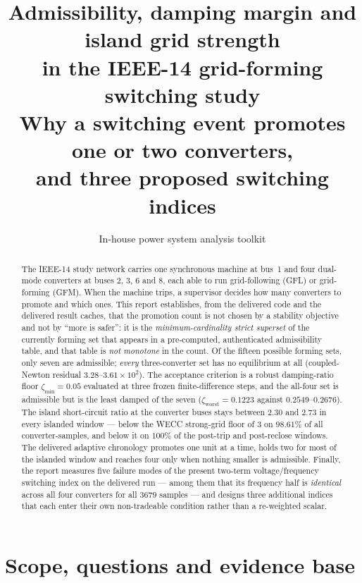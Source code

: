 \documentclass[12pt,a4paper]{article}
\title{\bfseries Admissibility, damping margin and island grid strength\\[2pt]
in the IEEE-14 grid-forming switching study\\[8pt]
\large Why a switching event promotes one or two converters,\\
and three proposed switching indices}
\author{In-house power system analysis toolkit}
\date{}
\theoremstyle{remark}
\newcommand{\zmin}{\zeta_{\min}}
\newcommand{\zworst}{\zeta_{\mathrm{worst}}}
\begin{document}
\maketitle
\thispagestyle{fancy}

\begin{abstract}
\noindent
The IEEE-14 study network carries one synchronous machine at bus~1 and four
dual-mode converters at buses 2, 3, 6 and 8, each able to run grid-following
(GFL) or grid-forming (GFM). When the machine trips, a supervisor decides how
many converters to promote and which ones. This report establishes, from the
delivered code and the delivered result caches, that the promotion count is not
chosen by a stability objective and not by ``more is safer'': it is the
\emph{minimum-cardinality strict superset} of the currently forming set that
appears in a pre-computed, authenticated admissibility table, and that table is
\emph{not monotone} in the count. Of the fifteen possible forming sets, only seven
are admissible; \emph{every} three-converter set has no equilibrium at all
(coupled-Newton residual $3.28$--$3.61\times10^{2}$). The acceptance criterion is
a robust damping-ratio floor $\zmin = 0.05$ evaluated at three frozen
finite-difference steps, and the all-four set is admissible but is the least
damped of the seven ($\zworst = 0.1223$ against $0.2549$--$0.2676$). The island
short-circuit ratio at the converter buses stays between $2.30$ and $2.73$ in
every islanded window --- below the WECC strong-grid floor of $3$ on $98.61\%$
of all converter-samples, and below it on $100\%$ of the post-trip and
post-reclose windows. The delivered adaptive chronology promotes one unit at a
time, holds two for most of the islanded window and reaches four only when
nothing smaller is admissible. Finally, the report measures five failure modes
of the present two-term voltage/frequency switching index on the delivered run
--- among them that its frequency half is \emph{identical} across all four
converters for all $3679$ samples --- and designs three additional indices that
each enter their own non-tradeable condition rather than a re-weighted scalar.
\end{abstract}

\tableofcontents
\clearpage

\section{Scope, questions and evidence base}
\end{document}
